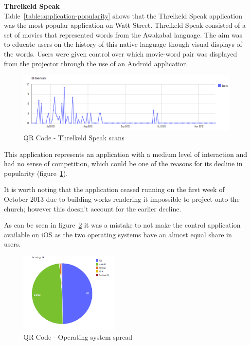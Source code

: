 \documentclass[a4paper,12pt]{article}
\begin{document}
\par
\textbf{Threlkeld Speak}\\
Table~\ref{table:application-popularity} shows that the Threlkeld Speak application was the most popular application on Watt Street.
Threlkeld Speak consisted of a set of movies that represented words from the Awakabal language. The aim was to educate users on the history of this native language though visual displays of the words.
Users were given control over which movie-word pair was displayed from the projector through the use of an Android application.
\par
\begin{figure}[ht!]
	\centering
	\includegraphics[width=150mm]{./images/threkeld-scans}
	\caption{QR Code - Threlkeld Speak scans}
	\label{QR-threkeld}
\end{figure}
This application represents an application with a medium level of interaction and had no sense of competition, which could be one of the reasons for its decline in popularity (figure~\ref{QR-threkeld}).

It is worth noting that the application ceased running on the first week of October 2013 due to building works rendering it impossible to project onto the church; however this doesn't account for the earlier decline.

As can be seen in figure~\ref{QR-OS-access} it was a mistake to not make the control application available on iOS as the two operating systems have an almost equal share in users.


\begin{figure}[ht!]
	\centering
	\includegraphics[width=50mm]{./images/OSAccess}
	\caption{QR Code - Operating system spread}
	\label{QR-OS-access}
\end{figure}
\end{document}
